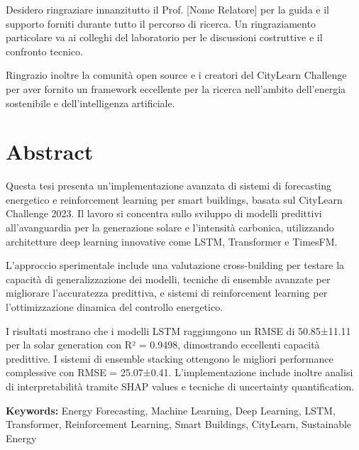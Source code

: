 \documentclass[12pt,a4paper,twoside]{report}
\begin{document}
Desidero ringraziare innanzitutto il Prof. [Nome Relatore] per la guida e il supporto forniti durante tutto il percorso di ricerca. Un ringraziamento particolare va ai colleghi del laboratorio per le discussioni costruttive e il confronto tecnico.

Ringrazio inoltre la comunità open source e i creatori del CityLearn Challenge per aver fornito un framework eccellente per la ricerca nell'ambito dell'energia sostenibile e dell'intelligenza artificiale.

\chapter*{Abstract}

Questa tesi presenta un'implementazione avanzata di sistemi di forecasting energetico e reinforcement learning per smart buildings, basata sul CityLearn Challenge 2023. Il lavoro si concentra sullo sviluppo di modelli predittivi all'avanguardia per la generazione solare e l'intensità carbonica, utilizzando architetture deep learning innovative come LSTM, Transformer e TimesFM.

L'approccio sperimentale include una valutazione cross-building per testare la capacità di generalizzazione dei modelli, tecniche di ensemble avanzate per migliorare l'accuratezza predittiva, e sistemi di reinforcement learning per l'ottimizzazione dinamica del controllo energetico.

I risultati mostrano che i modelli LSTM raggiungono un RMSE di 50.85±11.11 per la solar generation con R² = 0.9498, dimostrando eccellenti capacità predittive. I sistemi di ensemble stacking ottengono le migliori performance complessive con RMSE = 25.07±0.41. L'implementazione include inoltre analisi di interpretabilità tramite SHAP values e tecniche di uncertainty quantification.

\textbf{Keywords:} Energy Forecasting, Machine Learning, Deep Learning, LSTM, Transformer, Reinforcement Learning, Smart Buildings, CityLearn, Sustainable Energy

\tableofcontents
\listoffigures
\listoftables

\newpage
{}


\end{document}
